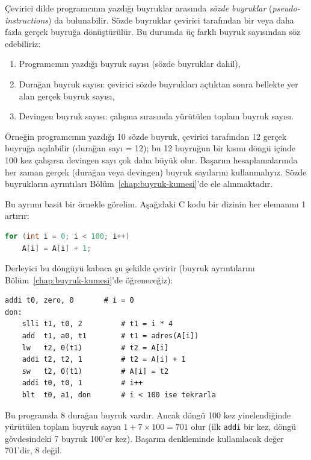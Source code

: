 \begin{bilginot}
Çevirici dilde programcının yazdığı buyruklar arasında \emph{sözde buyruklar} (\emph{pseudo-instructions}) da bulunabilir. Sözde buyruklar çevirici tarafından bir veya daha fazla gerçek buyruğa dönüştürülür. Bu durumda üç farklı buyruk sayısından söz edebiliriz:
\begin{enumerate}
\item Programcının yazdığı buyruk sayısı (sözde buyruklar dahil),
\item Durağan buyruk sayısı: çevirici sözde buyrukları açtıktan sonra bellekte yer alan gerçek buyruk sayısı,
\item Devingen buyruk sayısı: çalışma sırasında yürütülen toplam buyruk sayısı.
\end{enumerate}
Örneğin programcının yazdığı 10 sözde buyruk, çevirici tarafından 12 gerçek buyruğa açılabilir (durağan sayı = 12); bu 12 buyruğun bir kısmı döngü içinde 100 kez çalışırsa devingen sayı çok daha büyük olur. Başarım hesaplamalarında her zaman gerçek (durağan veya devingen) buyruk sayılarını kullanmalıyız. Sözde buyrukların ayrıntıları Bölüm~\ref{chap:buyruk-kumesi}'de ele alınmaktadır.
\end{bilginot}

Bu ayrımı basit bir örnekle görelim. Aşağıdaki C kodu bir dizinin her elemanını 1 artırır:

\begin{lstlisting}[language=C]
for (int i = 0; i < 100; i++)
    A[i] = A[i] + 1;
\end{lstlisting}

Derleyici bu döngüyü kabaca şu şekilde çevirir (buyruk ayrıntılarını Bölüm~\ref{chap:buyruk-kumesi}'de öğreneceğiz):

\begin{lstlisting}[style=riscv]
    addi t0, zero, 0       # i = 0
don:
    slli t1, t0, 2         # t1 = i * 4
    add  t1, a0, t1        # t1 = adres(A[i])
    lw   t2, 0(t1)         # t2 = A[i]
    addi t2, t2, 1         # t2 = A[i] + 1
    sw   t2, 0(t1)         # A[i] = t2
    addi t0, t0, 1         # i++
    blt  t0, a1, don       # i < 100 ise tekrarla
\end{lstlisting}

Bu programda 8 durağan buyruk vardır. Ancak döngü 100 kez yinelendiğinde yürütülen toplam buyruk sayısı $1 + 7 \times 100 = 701$ olur (ilk \texttt{addi} bir kez, döngü gövdesindeki 7 buyruk 100'er kez). Başarım denkleminde kullanılacak değer 701'dir, 8 değil.

